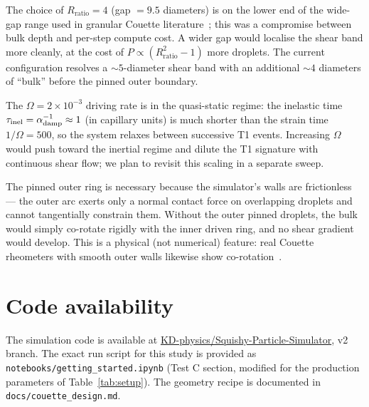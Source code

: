 \documentclass[aps,pre,twocolumn,floatfix,longbibliography]{revtex4-2}
\newcommand{\Rratio}{R_{\mathrm{ratio}}}
\begin{document}
The choice of $\Rratio = 4$ (gap $= 9.5$ diameters) is on the lower
end of the wide-gap range used in granular Couette
literature~\cite{mueth2000signatures,coussot2002viscosity};
this was a compromise between bulk depth and per-step compute cost.
A wider gap would localise the shear band more cleanly, at the
cost of $P \propto (\Rratio^2 - 1)$ more droplets.  The current
configuration resolves a $\sim 5$-diameter shear band with an
additional $\sim 4$ diameters of ``bulk'' before the pinned outer
boundary.

The $\Omega = 2 \times 10^{-3}$ driving rate is in the
quasi-static regime: the inelastic time
$\tau_{\rm inel} = \alpha_{\rm damp}^{-1} \approx 1$
(in capillary units) is much shorter than the strain time
$1/\Omega = 500$, so the system relaxes between successive
T1 events.  Increasing $\Omega$ would push toward the inertial
regime and dilute the T1 signature with continuous shear flow;
we plan to revisit this scaling in a separate sweep.

The pinned outer ring is necessary because the simulator's walls
are frictionless --- the outer arc exerts only a normal contact
force on overlapping droplets and cannot tangentially constrain
them.  Without the outer pinned droplets, the bulk would simply
co-rotate rigidly with the inner driven ring, and no shear gradient
would develop.  This is a physical (not numerical) feature: real
Couette rheometers with smooth outer walls likewise show
co-rotation~\cite{ananthakrishna1995boundary}.

\section{Code availability}

The simulation code is available at
\href{https://github.com/KD-physics/Squishy-Particle-Simulator}{KD-physics/Squishy-Particle-Simulator},
v2 branch.  The exact run script for this study is provided as
\texttt{notebooks/getting\_started.ipynb} (Test C section, modified
for the production parameters of Table~\ref{tab:setup}).  The
geometry recipe is documented in
\texttt{docs/couette\_design.md}.
\end{document}
